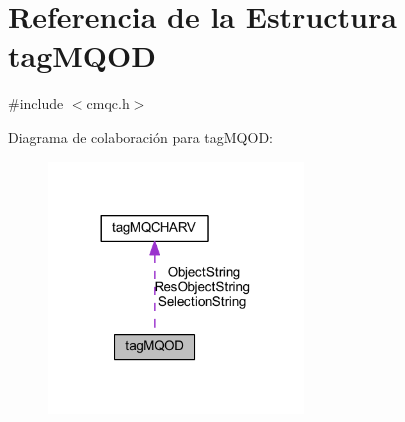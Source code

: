 \hypertarget{structtag_m_q_o_d}{}\section{Referencia de la Estructura tag\+M\+Q\+O\+D}
\label{structtag_m_q_o_d}


{\ttfamily \#include $<$cmqc.\+h$>$}



Diagrama de colaboración para tag\+M\+Q\+O\+D\+:\nopagebreak
\begin{figure}[H]
\begin{center}
\leavevmode
\includegraphics[width=192pt]{structtag_m_q_o_d__coll__graph}
\end{center}
\end{figure}
